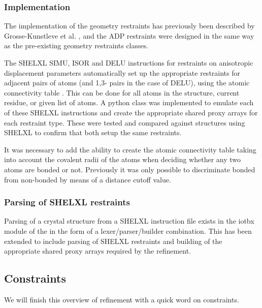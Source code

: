 \documentclass[12pt]{article}
\begin{document}

\subsubsection{Implementation}

The implementation of the geometry restraints has previously been described by Grosse-Kunstleve et al. \cite{cctbxnews:2004b}, and the ADP restraints were designed in the same way as the pre-existing geometry restraints classes.

The SHELXL SIMU, ISOR and DELU instructions for restraints on anisotropic displacement parameters automatically set up the appropriate restraints for adjacent pairs of atoms (and 1,3- pairs in the case of DELU), using the atomic connectivity table \cite{SHELX:man97}. This can be done for all atoms in the structure, current residue, or given list of atoms. A python class was implemented to emulate each of these SHELXL instructions and create the appropriate shared proxy arrays for each restraint type. These were tested and compared against structures using SHELXL to confirm that both setup the same restraints.

It was necessary to add the ability to create the \cctbx atomic connectivity table taking into account the covalent radii of the atoms when deciding whether any two atoms are bonded or not. Previously it was only possible to discriminate bonded from non-bonded by means of a distance cutoff value.




\subsubsection{Parsing of SHELXL restraints}

Parsing of a crystal structure from a SHELXL instruction file exists in the iotbx module of the \cctbx in the form of a lexer/parser/builder combination. This has been extended to include parsing of SHELXL restraints and building of the appropriate shared proxy arrays required by the refinement.

\subsection{Constraints}

We will finish this overview of refinement with a quick word on constraints.
\end{document}
